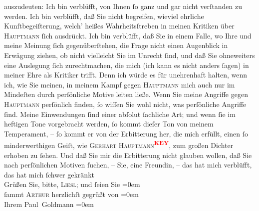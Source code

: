 \begin{ledgroupsized}[t]{13cm}
               auszudeuten: Ich bin  verblüfft, von Ihnen ſo ganz und gar nicht verſtanden zu werden. Ich
               bin verblüfft, daß Sie nicht begreifen, wieviel ehrliche Kunſtbegeiſterung, welch’
               heißes Wahrheitsſtreben in meinen Kritiken über \textsc{Hauptmann} ſich {\pb} ausdrückt. Ich bin
               verblüfft, daß Sie in einem Falle, wo Ihre und meine Meinung ſich gegenüberſtehen,
                  die Frage nicht einen Augenblick  in Erwägung ziehen, ob nicht vielleicht Sie im
               Unrecht ſind, und daß Sie ohneweiters eine Auslegung ſich zurechtmachen, die mich
               (ich kann es nicht anders ſagen) in meiner  Ehre als Kritiker trifft. Denn ich würde es für
               unehrenhaft halten, wenn ich, wie Sie meinen, in meinem Kampf gegen \textsc{Hauptmann} mich auch nur im Mindeſten durch perſönliche Motive leiten ließe. Wenn Sie
               meine Angriffe gegen \textsc{Hauptmann} perſönlich {\pb} finden, ſo
               wiſſen Sie wohl nicht, was perſönliche Angriffe ſind. Meine Einwendungen ſind einer
               abſolut ſachliche\label{XXXXv}\label{XXXX} Art; und wenn ſie im heftigen Tone
               vorgebracht werden, ſo kommt dieſer Ton von meinem Temperament, – ſo kommt er von der
               Erbitterung her, die mich erfüllt, einen ſo minderwerthigen Geiſt, wie \textsc{Gerhart Hauptmann\textcolor{red}{\textsuperscript{\textbf{KEY}}}}, zum großen Dichter erhoben zu ſehen. Und daß Sie mir die Erbitterung nicht
               glauben wollen, daß Sie nach perſönlichen Motiven ſuchen, – Sie, eine Freundin, – das
               hat mich verblüfft, das hat mich ſchwer gekränkt{\dotsfive}{\\[\baselineskip]}Grüßen Sie, bitte, \textsc{Liesl}; und ſeien Sie\pend
           \leftskip=0em{}\pstart
           {\\[\baselineskip]}ſammt \textsc{Arthur} herzlichſt gegrüßt von\pend
           \leftskip=0em{}\pstart
           {\\[\baselineskip]}Ihrem \spacefill\mbox{Paul Goldmann}\pend
           \leftskip=0em{}
         

\end{ledgroupsized}
